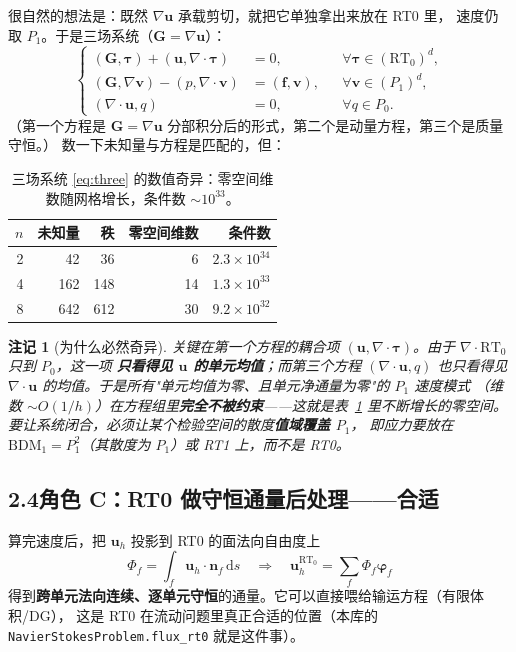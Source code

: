\documentclass[UTF8,11pt,a4paper]{ctexart}
\theoremstyle{wjplain}
\theoremstyle{wjdef}
\newtheorem*{remark}{注记}
\newcommand{\dd}{\,\mathrm{d}}
\newcommand{\bn}{\boldsymbol n}
\newcommand{\bu}{\boldsymbol u}
\newcommand{\bv}{\boldsymbol v}
\newcommand{\bG}{\boldsymbol G}
\newcommand{\bvarphi}{\boldsymbol\varphi}
\newcommand{\bT}{\boldsymbol\tau}
\newcommand{\grad}{\nabla}
\newcommand{\dive}{\nabla\cdot}
\newcommand{\RT}{\mathrm{RT}}
\begin{document}
很自然的想法是：既然 $\grad\bu$ 承载剪切，就把它单独拿出来放在 RT0 里，
速度仍取 $P_1$。于是三场系统（$\bG=\grad\bu$）：
\begin{equation}\tag{2.3}\label{eq:three}
  \left\{
  \begin{aligned}
    (\bG,\bT)+(\bu,\dive\bT)&=0, &&\forall\bT\in(\RT_0)^d,\\
    (\bG,\grad\bv)-(p,\dive\bv)&=(\boldsymbol f,\bv), &&\forall\bv\in(P_1)^d,\\
    (\dive\bu,q)&=0, &&\forall q\in P_0 .
  \end{aligned}
  \right.
\end{equation}
（第一个方程是 $\bG=\grad\bu$ 分部积分后的形式，第二个是动量方程，第三个是质量守恒。）
数一下未知量与方程是匹配的，但：

\begin{table}[H]
\centering\small
\begin{tabular}{@{}rrrrr@{}}
\toprule
$n$ & 未知量 & 秩 & 零空间维数 & 条件数 \\
\midrule
2 & 42  & 36  & 6  & $2.3\times10^{34}$ \\
4 & 162 & 148 & 14 & $1.3\times10^{33}$ \\
8 & 642 & 612 & 30 & $9.2\times10^{32}$ \\
\bottomrule
\end{tabular}
\caption{三场系统 \eqref{eq:three} 的数值奇异：零空间维数随网格增长，条件数 $\sim10^{33}$。}
\label{tab:three}
\end{table}

\begin{remark}[为什么必然奇异]
关键在第一个方程的耦合项 $(\bu,\dive\bT)$。由于 $\dive\RT_0$ 只到 $P_0$，这一项
\textbf{只看得见 $\bu$ 的单元均值}；而第三个方程 $(\dive\bu,q)$ 也只看得见
$\dive\bu$ 的均值。于是所有"单元均值为零、且单元净通量为零"的 $P_1$ 速度模式
（维数 $\sim O(1/h)$）在方程组里\textbf{完全不被约束}——这就是表~\ref{tab:three}
里不断增长的零空间。要让系统闭合，必须让某个检验空间的散度\textbf{值域覆盖 $P_1$}，
即应力要放在 $\mathrm{BDM}_1=P_1^2$（其散度为 $P_1$）或 RT1 上，而不是 RT0。
\end{remark}

\subsection*{2.4\quad 角色 C：RT0 做守恒通量后处理——合适}

算完速度后，把 $\bu_h$ 投影到 RT0 的面法向自由度上
\begin{equation}\tag{2.4}
  \Phi_f=\int_f \bu_h\cdot\bn_f\dd s\quad\Longrightarrow\quad
  \bu_h^{\RT_0}=\sum_f\Phi_f\bvarphi_f
\end{equation}
得到\textbf{跨单元法向连续、逐单元守恒}的通量。它可以直接喂给输运方程（有限体积/DG），
这是 RT0 在流动问题里真正合适的位置（本库的
\texttt{NavierStokesProblem.flux\_rt0} 就是这件事）。
\end{document}

